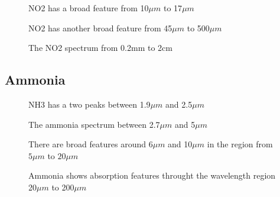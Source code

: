 \documentclass[12pt]{article}
\begin{document}
\vspace*{11.5cm}
\begin{figure}[htb]
\caption{NO2 has a broad feature from 10$\mu m$ to 17$\mu m$}
\end{figure}
\newpage

\vspace*{11.5cm}
\begin{figure}[htb]
\caption{NO2 has another broad feature from 45$\mu m$ to 500$\mu m$}
\end{figure}
\newpage

\vspace*{11.5cm}
\begin{figure}[htb]
\caption{The NO2 spectrum from 0.2mm to 2cm}
\end{figure}
\newpage


\subsection{Ammonia}

\vspace*{11.5cm}
\begin{figure}[htb]
\caption{NH3 has a two peaks between 1.9$\mu m$ and 2.5$\mu m$}
\end{figure}
\newpage


\vspace*{11.5cm}
\begin{figure}[htb]
\caption{The ammonia spectrum between  2.7$\mu m$ and 5$\mu m$}
\end{figure}
\newpage

\vspace*{11.5cm}
\begin{figure}[htb]
\caption{There are broad features around   6$\mu m$ and 10$\mu m$ in the region
from $5 \mu m$ to $20 \mu m$}
\end{figure}
\newpage

\vspace*{11.5cm}
\begin{figure}[htb]
\caption{Ammonia shows absorption features throught the wavelength region 20$\mu m$ to 200$\mu m$}
\end{figure}
\newpage
\end{document}
